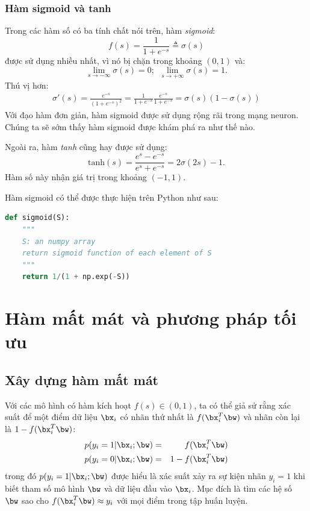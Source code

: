  
\subsubsection{Hàm sigmoid và tanh}

Trong các hàm số có ba tính chất nói trên, hàm \textit{sigmoid}: 
\begin{equation} 
f(s) = \frac{1}{1 + e^{-s}} \triangleq \sigma(s) 
\end{equation} 
được sử dụng nhiều nhất, vì nó bị chặn trong khoảng $(0, 1)$ và:
\begin{equation} 
\lim_{s \rightarrow -\infty}\sigma(s) = 0; ~~ \lim_{s \rightarrow +\infty}\sigma(s) = 1.
\end{equation} 
Thú vị hơn:
\begin{eqnarray} 
\sigma'(s) = \frac{e^{-s}}{(1 + e^{-s})^2} 
= \frac{1}{1 + e^{-s}} \frac{e^{-s}}{1 + e^{-s}} 
= \sigma(s)(1 - \sigma(s)) 
\end{eqnarray} 
Với đạo hàm đơn giản, hàm sigmoid được sử dụng rộng rãi trong mạng neuron. {Chúng ta sẽ sớm thấy hàm sigmoid được khám phá ra như thế nào.}
 
Ngoài ra, hàm \textit{tanh} cũng hay được sử dụng: 
\begin{equation} 
\displaystyle
\text{tanh}(s) = \frac{e^{s} - e^{-s}}{e^s + e^{-s}} = 2\sigma(2s) - 1.
\end{equation} 
Hàm số này nhận giá trị trong khoảng $(-1, 1)$. 

Hàm sigmoid có thể được thực hiện trên Python như sau:
\begin{lstlisting}[language=Python]
def sigmoid(S):
    """
    S: an numpy array
    return sigmoid function of each element of S
    """
    return 1/(1 + np.exp(-S))
\end{lstlisting}



 
 
\section{Hàm mất mát và phương pháp tối ưu}
 
 
\subsection{Xây dựng hàm mất mát}
 
Với các mô hình có hàm kích hoạt $f(s) \in (0, 1)$, ta có thể
giả sử rằng xác suất để một điểm dữ liệu $\bx_i$ có nhãn thứ nhất là
$f(\bx_i^T\bw)$ và nhãn còn lại là $1 -
f(\bx_i^T\bw)$:
\begin{eqnarray} 
\label{eqn:10_1}
p(y_i = 1 | \bx_i; \bw) &=& f(\bx_i^T\bw)  \\
\label{eqn:10_2}
p(y_i = 0 | \bx_i; \bw) &=& 1 - f(\bx_i^T\bw)
\end{eqnarray} 
trong đó $p(y_i = 1 | \bx_i; \bw)$ được hiểu là xác suất xảy ra sự
kiện nhãn $y_i = 1$ khi biết tham số mô hình $\bw$ và dữ liệu đầu vào
$\bx_i$. 
Mục đích là tìm các hệ số $\bw$ sao cho $f(\bx_i^T\bw) \approx y_i$ với mọi điểm trong tập huấn luyện. 


